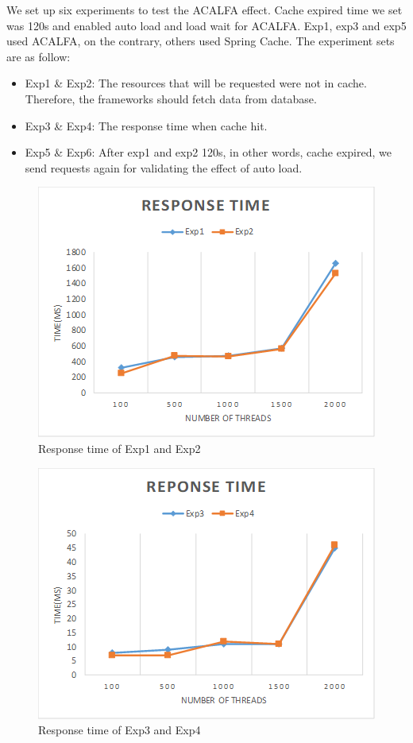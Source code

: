 \documentclass{singlecol-new}
\theoremstyle{TH}{
\newtheorem{lemma}{Lemma}
\newtheorem{theorem}[lemma]{Theorem}
\newtheorem{corrolary}[lemma]{Corrolary}
\newtheorem{conjecture}[lemma]{Conjecture}
\newtheorem{proposition}[lemma]{Proposition}
\newtheorem{claim}[lemma]{Claim}
\newtheorem{stheorem}[lemma]{Wrong Theorem}
}
\theoremstyle{THrm}{
\newtheorem{definition}{Definition}[section]
\newtheorem{question}{Question}[section]
\newtheorem{remark}{Remark}
\newtheorem{scheme}{Scheme}
}
\theoremstyle{THhit}{
\newtheorem{case}{Case}[section]
}
\begin{document}
We set up six experiments to test the ACALFA effect. Cache expired time we set was 120s and enabled auto load and load wait for ACALFA. Exp1, exp3 and exp5 used ACALFA, on the contrary, others used Spring Cache. The experiment sets are as follow:

\begin{itemize}
    \item Exp1 \& Exp2: The resources that will be requested were not in cache. Therefore, the frameworks should fetch data from database.
    \item Exp3 \& Exp4: The response time when cache hit.
    \item Exp5 \& Exp6: After exp1 and exp2 120s, in other words, cache expired, we send requests again for validating the effect of auto load.
\end{itemize}

\begin{figure} [htb]
    \centering
    \includegraphics[width=1\linewidth]{img/exp1-2.png}
    \caption{Response time of Exp1 and Exp2}
    \label{exp1-2}
\end{figure}

\begin{figure} [htb]
    \centering
    \includegraphics[width=1\linewidth]{img/exp3-4.png}
    \caption{Response time of Exp3 and Exp4}
    \label{exp3-4}
\end{figure}
\end{document}
